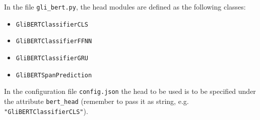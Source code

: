 \begin{tcolorbox}[
  colback=blue!5!white,
  colframe=blue!75!black,
  title={\centering Code}]

  In the file \texttt{gli\_bert.py}, the head modules are defined as the following classes:

  \begin{itemize}
    \itemsep0em
    \item[] \texttt{GliBERTClassifierCLS}
    \item[] \texttt{GliBERTClassifierFFNN}
    \item[] \texttt{GliBERTClassifierGRU}
    \item[] \texttt{GliBERTSpanPrediction}
  \end{itemize}

  In the configuration file \texttt{config.json} the head to be used is to be
  specified under the attribute \texttt{bert\_head} (remember to pass it as string, e.g. \texttt{"GliBERTClassifierCLS"}).
\end{tcolorbox}



